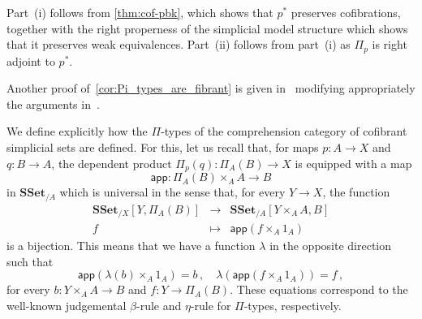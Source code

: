 \documentclass[reqno,10pt,a4paper,oneside]{amsart}
\makeatletter
\renewenvironment{proof}[1][\proofname] {\par\pushQED{\qed}\normalfont\topsep6\p@\@plus6\p@\relax\trivlist\item[\hskip\labelsep\bf#1\@addpunct{.}]\ignorespaces}{\popQED\endtrivlist\@endpefalse}
\numberwithin{equation}{section}
\theoremstyle{mythm}
\theoremstyle{mydef}
\theoremstyle{myrmk}
\newcommand{\co}{\colon}
\newcommand{\SSet}{\mathbf{SSet}}
\makeatother
\begin{document}
\begin{proof} Part~(i) follows from \cref{thm:cof-pbk}, which shows that $p^*$ preserves cofibrations, together with the right properness of the simplicial model structure which shows that it preserves weak equivalences.
 Part~(ii) follows from part~(i) as $\Pi_p$ is right adjoint to $p^*$.
\end{proof}


Another proof of~\cref{cor:Pi_types_are_fibrant} is given in~\cite[Section~4]{GambinoN:anocp} modifying appropriately the arguments in~\cite{gambino2017frobenius}.


 
\begin{remark}  \label{rem:pi-types}
We define explicitly how the $\Pi$-types of the comprehension category of cofibrant simplicial sets are defined. For this, let us recall that, for maps $p \co A \to X$ and $q \co B \to A$,  the dependent product $\Pi_p(q) \co \Pi_A(B)
\to X$ is equipped with a map
\[
\mathsf{app} \co \Pi_A(B) \times_A  A \to B
\] 
in $\SSet_{/A}$ which is universal in the sense that, for every  $Y \to X$, the function
\[
\begin{array}{rcl} 
 \SSet_{/X}[ Y , \Pi_A(B)] & \longrightarrow &  \SSet_{/A}[Y \times_A A, B]  \\
  f & \longmapsto & \mathsf{app}(f \times_A 1_A) 
  \end{array} 
 \]
 is a bijection. This means that we have a function $\lambda$ in the opposite direction such that  
 \begin{equation}
 \label{equ:betaeta}
 \mathsf{app}(\lambda(b) \times_A 1_A) = b   \, , \quad
 \lambda( \mathsf{app}(f \times_A 1_A)) = f \, ,
 \end{equation}
 for every $b \co Y \times_A A \to B$ and $f \co Y \to \Pi_A(B)$.  These equations correspond to the
 well-known judgemental $\beta$-rule and $\eta$-rule for $\Pi$-types, respectively.
 

\end{remark}
\end{document}
